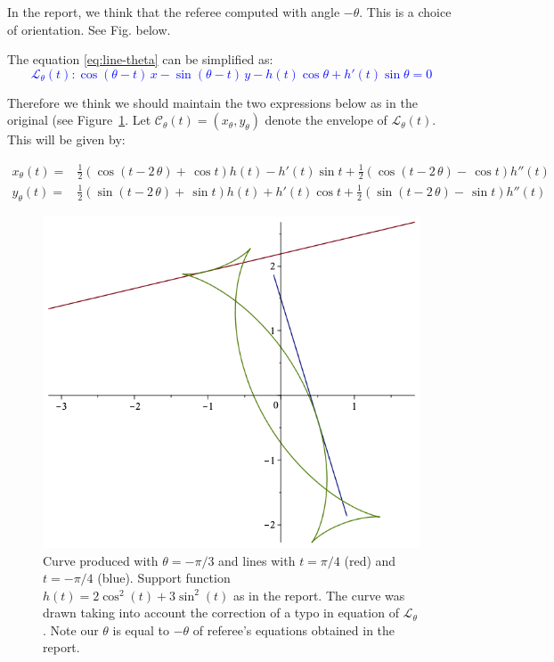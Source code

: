 In the report, we think that the referee computed with angle $-\theta$. This is a choice of orientation.  See Fig. below.

 The equation \eqref{eq:line-theta} can be simplified as:
\textcolor{blue}{
\[ 
 \mathcal{L}_{\theta}(t):   \cos(\theta-t) \,x -  \sin(\theta-t)\, y - h(t) \cos\theta + h'(t)  \sin\theta = 0 \]
 }

Therefore we think we should maintain the two expressions below as in the original (see Figure~\ref{fig:referee}. Let $\mathcal{C}_\theta(t)=(x_\theta,y_\theta)$ denote the envelope of $\mathcal{L}_\theta(t)$. This will be given by:
 
\begin{align*} x_{\theta}(t)=&\frac{1}{2}  \left( \cos \left( t-2\,\theta \right) + 
  \,\cos t  \right) h \left( t \right) -h'(t)\sin t    +\frac{1}{2} \left(\cos \left( t-2\,\theta 
  \right) - \,\cos t  \right)  h'' \left( t \right) \\
  y_{\theta}(t)=&\frac{1}{2} \left(\sin \left( t-2\,\theta \right)  +
  \,\sin t \right) h(t)   +h'(t)\cos t    +\frac{1}{2} \left(\sin \left( t-2\,\theta 
  \right) - \,\sin t  \right)  h'' (t)
 \end{align*}
 
  

 \begin{figure}[H]
     \centering
     \includegraphics[scale=0.5]{pics/figura_gerada_curva_referee.png}
     \caption{Curve produced with  $\theta=-\pi/3$ and lines with $t=\pi/4$ (red) and $t=-\pi/4$ (blue). Support function $h(t)=2\cos^2(t) + 3\sin^2(t)$ as in the report. The curve was drawn taking into account  the correction of a typo in equation of $\mathcal{L}_{\theta}$. Note our $\theta$ is equal to $-\theta$ of referee's equations obtained in the report.}
     \label{fig:referee}
 \end{figure}
 
